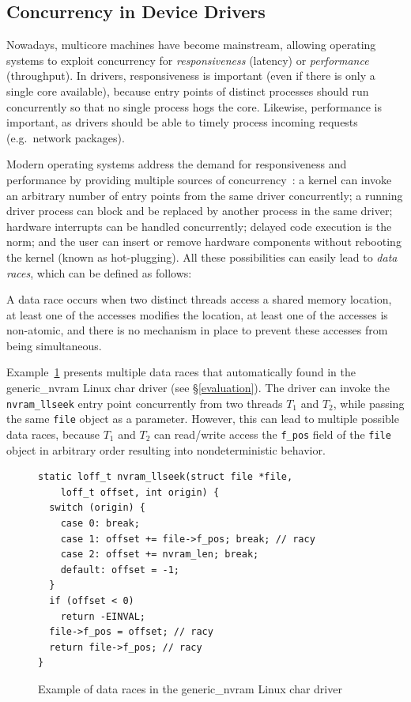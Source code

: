 \subsection{Concurrency in Device Drivers}
\label{bg:concurrency}

Nowadays, multicore machines have become mainstream, allowing operating systems to exploit concurrency for \emph{responsiveness} (latency) or \emph{performance} (throughput). In drivers, responsiveness is important (even if there is only a single core available), because entry points of distinct processes should run concurrently so that no single process hogs the core. Likewise, performance is important, as drivers should be able to timely process incoming requests (e.g.\ network packages).

Modern operating systems address the demand for responsiveness and performance by providing multiple sources of concurrency~\cite{corbet2005linux}: a kernel can invoke an arbitrary number of entry points from the same driver concurrently; a running driver process can block and be replaced by another process in the same driver; hardware interrupts can be handled concurrently; delayed code execution is the norm; and the user can insert or remove hardware components without rebooting the kernel (known as hot-plugging). All these possibilities can easily lead to \emph{data races}, which can be defined as follows:

\begin{definition}
\label{definition:datarace}
A data race occurs when two distinct threads access a shared memory location, at least one of the accesses modifies the location, at least one of the accesses is non-atomic, and there is no mechanism in place to prevent these accesses from being simultaneous.
\end{definition}

Example~\ref{fig:data_race_example} presents multiple data races that \whoop automatically found in the generic\_nvram Linux char driver (see \S\ref{evaluation}). The driver can invoke the \texttt{nvram\_llseek} entry point concurrently from two threads $T_1$ and $T_2$, while passing the same \texttt{file} object as a parameter. However, this can lead to multiple possible data races, because $T_1$ and $T_2$ can read/write access the \texttt{f\_pos} field of the \texttt{file} object in arbitrary order resulting into nondeterministic behavior.

\begin{figure}[t]
\begin{lstlisting}
static loff_t nvram_llseek(struct file *file,
    loff_t offset, int origin) {
  switch (origin) {
    case 0: break;
    case 1: offset += file->f_pos; break; // racy
    case 2: offset += nvram_len; break;
    default: offset = -1;
  }
  if (offset < 0)
    return -EINVAL;
  file->f_pos = offset; // racy
  return file->f_pos; // racy
}
\end{lstlisting}
\caption{Example of data races in the generic\_nvram Linux char driver}
\label{fig:data_race_example}
\end{figure}

